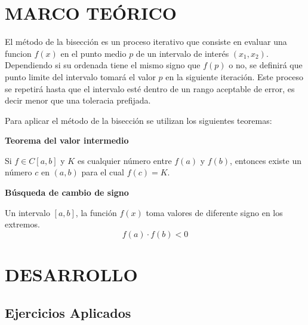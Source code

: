 \documentclass[12pt]{article}
\begin{document}
\section*{MARCO TEÓRICO}
El método de la bisección es un proceso iterativo que consiste en evaluar una funcion \(f(x)\) en el punto medio \(p\) de un intervalo de interés \((x_1,x_2)\).
Dependiendo si su ordenada tiene el mismo signo que \(f(p)\) o no, se definirá que punto limite del intervalo tomará el valor \(p\) en la siguiente iteración. 
Este proceso se repetirá hasta que el intervalo esté dentro de un rango aceptable de error, es decir menor que una toleracia prefijada\cite{mathews2000metodos}.

Para aplicar el método de la bisección se utilizan los siguientes teoremas:

\textbf{Teorema del valor intermedio}

Si \(f \in C[a,b]\) y \(K\) es cualquier número entre \(f(a)\) y \(f(b)\), entonces existe un número \(c\) en \((a,b)\) para el cual \(f(c) = K\).

\textbf{Búsqueda de cambio de signo}

Un intervalo \([a,b]\), la función \(f(x)\) toma valores de diferente signo en los extremos.
\[f(a) \cdot f(b) < 0\]

\section*{DESARROLLO}

\subsection*{Ejercicios Aplicados}
\end{document}
